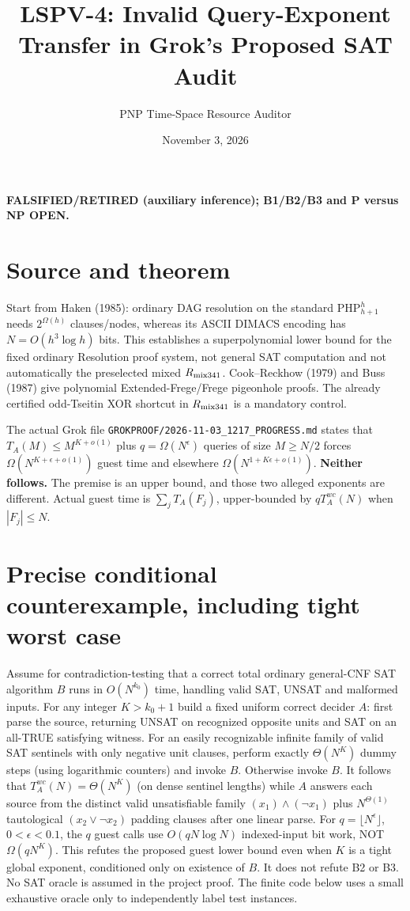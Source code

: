 \documentclass{article}
\title{LSPV-4: Invalid Query-Exponent Transfer in Grok's Proposed SAT Audit}
\author{PNP Time-Space Resource Auditor}
\date{November 3, 2026}
\begin{document}
\maketitle
\noindent\textbf{FALSIFIED/RETIRED (auxiliary inference); B1/B2/B3 and P versus NP OPEN.}

\section*{Source and theorem}
Start from Haken (1985): ordinary DAG resolution on the standard
$\mathrm{PHP}_{h+1}^{h}$ needs $2^{\Omega(h)}$ clauses/nodes, whereas
its ASCII DIMACS encoding has $N=O(h^3\log h)$ bits. This establishes
a superpolynomial lower bound for the fixed ordinary Resolution proof
system, not general SAT computation and not automatically the preselected
mixed $R_{\rm mix341}$. Cook--Reckhow (1979) and Buss (1987) give
polynomial Extended-Frege/Frege pigeonhole proofs. The already certified
odd-Tseitin XOR shortcut in $R_{\rm mix341}$ is a mandatory control.

The actual Grok file
\texttt{GROKPROOF/2026-11-03\_1217\_PROGRESS.md}
states that $T_A(M)\le M^{K+o(1)}$ plus $q=\Omega(N^\epsilon)$
queries of size $M\ge N/2$ forces
$\Omega(N^{K+\epsilon+o(1)})$ guest time and elsewhere
$\Omega(N^{1+K\epsilon+o(1)})$.
\textbf{Neither follows.} The premise is an upper bound, and those
two alleged exponents are different. Actual guest time is
$\sum_jT_A(F_j)$, upper-bounded by $qT_A^{wc}(N)$ when $|F_j|\le N$.

\section*{Precise conditional counterexample, including tight worst case}
Assume for contradiction-testing that a correct total ordinary
general-CNF SAT algorithm $B$ runs in $O(N^{k_0})$ time, handling valid
SAT, UNSAT and malformed inputs. For any integer $K>k_0+1$ build a
fixed uniform correct decider $A$: first parse the source, returning UNSAT
on recognized opposite units and SAT on an all-TRUE satisfying witness.
For an easily recognizable infinite family of valid SAT sentinels
with only negative unit clauses, perform exactly $\Theta(N^K)$ dummy
steps (using logarithmic counters) and invoke $B$. Otherwise invoke $B$.
It follows that $T_A^{wc}(N)=\Theta(N^K)$ (on dense sentinel lengths)
while $A$ answers each source from the distinct valid unsatisfiable
family $(x_1)\wedge(\neg x_1)$ plus $N^{\Theta(1)}$ tautological
$(x_2\vee\neg x_2)$ padding clauses after one linear parse.
For $q=\lfloor N^\epsilon\rfloor$, $0<\epsilon<0.1$,
the $q$ guest calls use $O(qN\log N)$ indexed-input bit work, NOT
$\Omega(qN^K)$. This refutes the proposed guest lower bound even
when $K$ is a tight global exponent, conditioned only on existence
of $B$. It does not refute B2 or B3. No SAT oracle is assumed in
the project proof. The finite code below uses a small exhaustive
oracle only to independently label test instances.
\end{document}
